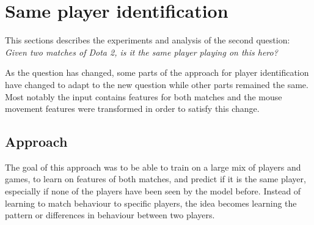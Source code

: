 \documentclass[Report.tex]{subfiles}
\begin{document}
\section{Same player identification}\label{sec:pair-classification}
This sections describes the experiments and analysis of the second question: \textit{Given two matches of Dota 2, is it the same player playing on this hero?}

As the question has changed, some parts of the approach for player identification have changed to adapt to the new question while other parts remained the same. Most notably the input contains features for both matches and the mouse movement features were transformed in order to satisfy this change. 

\subsection{Approach}

The goal of this approach was to be able to train on a large mix of players and games, to learn on features of both matches, and predict if it is the same player, especially if none of the players have been seen by the model before. Instead of learning to match behaviour to specific players, the idea becomes learning the pattern or differences in behaviour between two players. 
\end{document}
